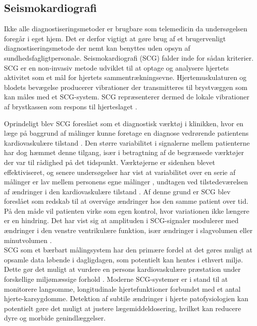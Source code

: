 \subsection{Seismokardiografi}
Ikke alle diagnostiseringsmetoder er brugbare som telemedicin da undersøgelsen foregår i eget hjem. Det er derfor vigtigt at gøre brug af et brugervenligt diagnostiseringsmetode der nemt kan benyttes uden opsyn af sundhedsfagligtpersonale. Seismokardiografi (SCG) falder inde for sådan kriterier.
SCG er en non-invasiv metode udviklet til at optage og analysere hjertets aktivitet som et mål for hjertets sammentrækningsevne. Hjertemuskulaturen og blodets bevægelse producerer vibrationer der transmitteres til brystvæggen som kan måles med et SCG-system. SCG repræsenterer dermed de lokale vibrationer af brystkassen som respons til hjerteslaget \cite{inan2015}.

Oprindeligt blev SCG foreslået som et diagnostisk værktøj i klinikken, hvor en læge på baggrund af målinger kunne foretage en diagnose vedrørende patientens kardiovaskulære tilstand \cite{starr1939}. Den større variabilitet i signalerne mellem patienterne har dog hæmmet denne tilgang, især i betragtning af de begrænsede værktøjer der var til rådighed på det tidspunkt. Værktøjerne er sidenhen blevet effektiviseret, og senere undersøgelser har vist at variabilitet over en serie af målinger er lav mellem personens egne målinger \cite{inan2009}, undtagen ved tilstedeværelsen af ændringer i den kardiovaskulære tilstand \cite{inan2015}. Af denne grund er SCG blev foreslået som redskab til at overvåge ændringer hos den samme patient over tid. På den måde vil patienten virke som egen kontrol, hvor variationen ikke længere er en hindring. Det har vist sig at amplituden i SCG-signaler modulerer med ændringer i den venstre ventrikulære funktion, især ændringer i slagvolumen eller minutvolumen \cite{inan2015}.\\
SCG som et bærbart målingsystem har den primære fordel at det gøres muligt at opsamle data løbende i dagligdagen, som potentielt kan hentes i ethvert miljø. Dette gør det muligt at vurdere en persons kardiovaskulære præstation under forskellige miljømæssige forhold \cite{inan2015}. Moderne SCG-systemer er i stand til at monitorere langsomme, longitudinale hjertefunktioner forbundet med et antal hjerte-karsygdomme. Detektion af subtile ændringer i hjerte patofysiologien kan potentielt gøre det muligt at justere lægemiddeldosering, hvilket kan reducere dyre og morbide genindlæggelser. \cite{munir2008}

